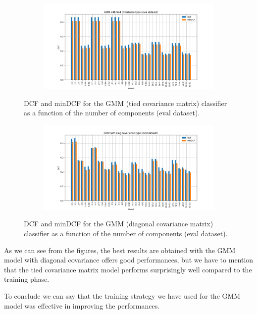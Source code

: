 \documentclass[12pt]{report}
\newcommand{\nl}{%
    \newline
    \noindent
}
\begin{document}
\begin{figure}[H]
    \centering
    \begin{subfigure}[t]{0.6\textwidth}
        \includegraphics[width=\textwidth]{./plot/eval/GMM/gmm_tied.png}
    \end{subfigure}
    \caption{DCF and minDCF for the GMM (tied covariance matrix) classifier as a function of the number of components (eval dataset).}
    \label{fig:gmm_tied_eval}
\end{figure}

\begin{figure}[H]
    \centering
    \begin{subfigure}[t]{0.6\textwidth}
        \includegraphics[width=\textwidth]{./plot/eval/GMM/gmm_diag.png}
    \end{subfigure}
    \caption{DCF and minDCF for the GMM (diagonal covariance matrix) classifier as a function of the number of components (eval dataset).}
    \label{fig:gmm_diag_eval}
\end{figure}

As we can see from the figures, the best results are obtained with the GMM model with diagonal covariance offers good performances, but we have to mention that the tied covariance matrix model performs surprisingly well compared to the training phase.
\nl
To conclude we can say that the training strategy we have used for the GMM model was effective in improving the performances.
\end{document}
